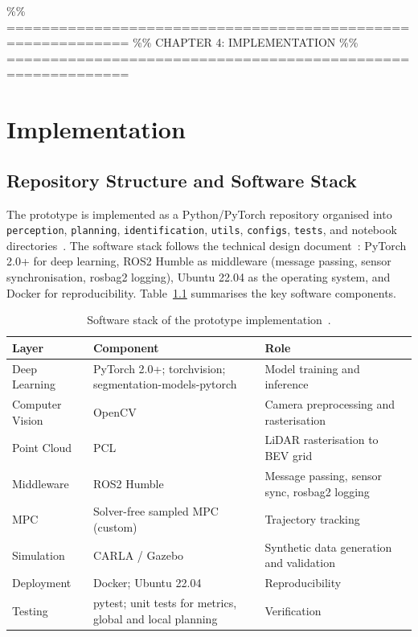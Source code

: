 \documentclass[12pt, a4paper]{article}
\begin{document}
\%\% ============================================================
\%\% CHAPTER 4: IMPLEMENTATION
\%\% ============================================================
\chapter{Implementation}
\label{ch:implementation}

\section{Repository Structure and Software Stack}

The prototype is implemented as a Python/PyTorch repository organised into
\texttt{perception}, \texttt{planning}, \texttt{identification}, \texttt{utils},
\texttt{configs}, \texttt{tests}, and notebook directories~\cite{ref234}. The software
stack follows the technical design document~\cite{ref233}: PyTorch 2.0+ for deep learning,
ROS2 Humble as middleware (message passing, sensor synchronisation, rosbag2 logging),
Ubuntu 22.04 as the operating system, and Docker for reproducibility. Table~\ref{tab:softwarestack} summarises the key software components.

\begin{table}[htbp]
\centering
\caption{Software stack of the prototype implementation~\cite{ref233, ref234}.}
\label{tab:softwarestack}
\begin{tabularx}{\textwidth}{l X X}
\toprule
\textbf{Layer} & \textbf{Component} & \textbf{Role} \\
\midrule
Deep Learning & PyTorch 2.0+; torchvision; segmentation-models-pytorch & Model training and inference \\
\addlinespace
Computer Vision & OpenCV & Camera preprocessing and rasterisation \\
\addlinespace
Point Cloud & PCL & LiDAR rasterisation to BEV grid \\
\addlinespace
Middleware & ROS2 Humble & Message passing, sensor sync, rosbag2 logging \\
\addlinespace
MPC & Solver-free sampled MPC (custom) & Trajectory tracking \\
\addlinespace
Simulation & CARLA / Gazebo & Synthetic data generation and validation \\
\addlinespace
Deployment & Docker; Ubuntu 22.04 & Reproducibility \\
\addlinespace
Testing & pytest; unit tests for metrics, global and local planning & Verification \cite{ref234} \\
\bottomrule
\end{tabularx}
\end{table}
\end{document}
